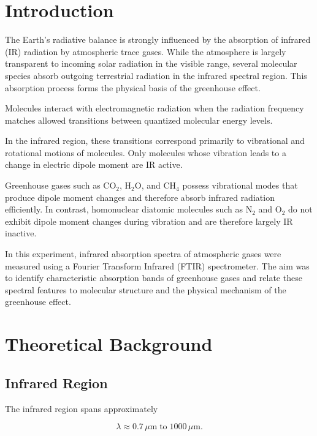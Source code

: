 
\section{Introduction}\label{Sec: Intro}

The Earth's radiative balance is strongly influenced by the absorption of infrared (IR) radiation by atmospheric trace gases. While the atmosphere is largely transparent to incoming solar radiation in the visible range, several molecular species absorb outgoing terrestrial radiation in the infrared spectral region. This absorption process forms the physical basis of the greenhouse effect.

Molecules interact with electromagnetic radiation when the radiation frequency matches allowed transitions between quantized molecular energy levels. 

In the infrared region, these transitions correspond primarily to vibrational and rotational motions of molecules. Only molecules whose vibration leads to a change in electric dipole moment are IR active.

Greenhouse gases such as CO$_2$, H$_2$O, and CH$_4$ possess vibrational modes that produce dipole moment changes and therefore absorb infrared radiation efficiently. In contrast, homonuclear diatomic molecules such as N$_2$ and O$_2$ do not exhibit dipole moment changes during vibration and are therefore largely IR inactive.

In this experiment, infrared absorption spectra of atmospheric gases were measured using a Fourier Transform Infrared (FTIR) spectrometer. The aim was to identify characteristic absorption bands of greenhouse gases and relate these spectral features to molecular structure and the physical mechanism of the greenhouse effect.

\section{Theoretical Background} \label{Sec: Theory}

\subsection{Infrared Region} \label{Infrared Regions}

The infrared region spans approximately

\begin{equation}
\lambda \approx 0.7\,\mu\text{m} \; \text{to} \; 1000\,\mu\text{m}.
\end{equation}

